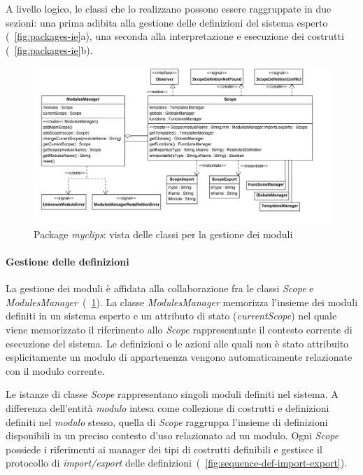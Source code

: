 A livello logico, le classi che lo realizzano possono essere raggruppate in due sezioni: una prima adibita alla gestione delle definizioni del sistema esperto (\figurename~\ref{fig:packages-ie}a), una seconda alla interpretazione e esecuzione dei costrutti (\figurename~\ref{fig:packages-ie}b).

\begin{figure}[h]
\centering
\includegraphics[width=1\textwidth]{Immagini/Capitolo3/Classi/myclips_Scope-ModulesManager.png}
\caption{Package \emph{myclips}: vista delle classi per la gestione dei moduli}\label{fig:class-myclips-scope-mm}
\end{figure}

\paragraph{Gestione delle definizioni}

La gestione dei moduli è affidata alla collaborazione fra le classi \emph{Scope} e \emph{ModulesManager}~(\figurename~\ref{fig:class-myclips-scope-mm}).
La classe \emph{ModulesManager} memorizza l'insieme dei moduli definiti in un sistema esperto e un attributo di stato (\emph{currentScope}) nel quale viene memorizzato il riferimento allo \emph{Scope} rappresentante il contesto corrente di esecuzione del sistema. Le definizioni o le azioni alle quali non è stato attribuito esplicitamente un modulo di appartenenza vengono automaticamente relazionate con il modulo corrente.

Le istanze di classe \emph{Scope} rappresentano singoli moduli definiti nel sistema. A differenza dell'entità \emph{modulo} intesa come collezione di costrutti e definizioni definiti nel \emph{modulo} stesso, quella di \emph{Scope} raggruppa l'insieme di definizioni disponibili in un preciso contesto d'uso relazionato ad un modulo. Ogni \emph{Scope} possiede i riferimenti ai manager dei tipi di costrutti definibili e gestisce il protocollo di \emph{import/export} delle definizioni~(\figurename~\ref{fig:sequence-def-import-export}).

